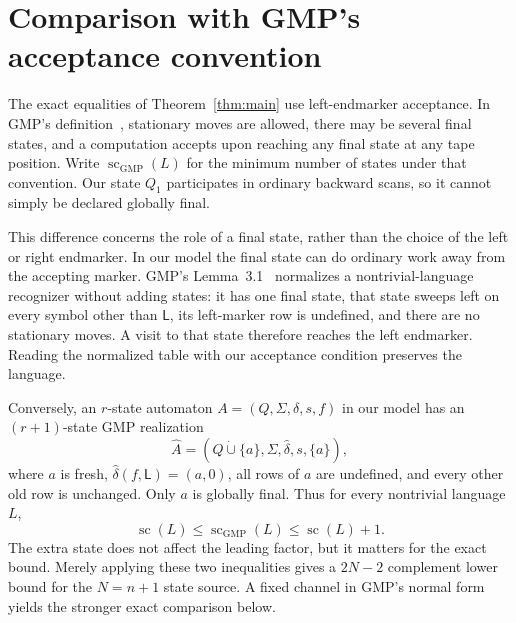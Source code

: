 \documentclass[11pt,a4paper]{article}
\theoremstyle{definition}
\theoremstyle{remark}
\newcommand{\LL}{\mathsf L}
\newcommand{\statecomplexity}{\operatorname{sc}}
\begin{document}
\section{Comparison with GMP's acceptance convention}\label{sec:conventions}

The exact equalities of Theorem~\ref{thm:main} use left-endmarker
acceptance. In GMP's definition~\cite[Section~2]{GMP}, stationary
moves are allowed, there may be several final states, and a computation
accepts upon reaching any final state at any tape position. Write
$\operatorname{sc}_{\mathrm{GMP}}(L)$ for the minimum number of states
under that convention. Our state $Q_1$ participates in ordinary
backward scans, so it cannot simply be declared globally final.

This difference concerns the role of a final state, rather than the
choice of the left or right endmarker. In our model the final state
can do ordinary work away from the accepting marker. GMP's
Lemma~3.1~\cite[pp.~1176--1177]{GMP} normalizes a nontrivial-language
recognizer without adding states: it has one final state, that state
sweeps left on every symbol other than $\LL$, its left-marker row
is undefined, and there are no stationary moves. A visit to that
state therefore reaches the left endmarker. Reading the normalized
table with our acceptance condition preserves the language.

Conversely, an $r$-state automaton $A=(Q,\Sigma,\delta,s,f)$ in
our model has an $(r+1)$-state GMP realization
\[
 \widehat A=(Q\mathbin{\dot\cup}\{a\},\Sigma,\widehat\delta,s,\{a\}),
\]
where $a$ is fresh, $\widehat\delta(f,\LL)=(a,0)$, all rows of
$a$ are undefined, and every other old row is unchanged. Only $a$
is globally final. Thus for every nontrivial language $L$,
\[
 \statecomplexity(L)\le \operatorname{sc}_{\mathrm{GMP}}(L)
              \le \statecomplexity(L)+1.
\]
The extra state does not affect the leading factor, but it matters
for the exact bound. Merely applying these two
inequalities gives a $2N-2$ complement lower bound for the
$N=n+1$ state source. A fixed channel in GMP's normal form yields
the stronger exact comparison below.
\end{document}
